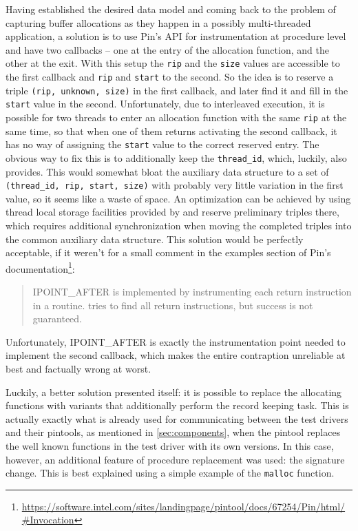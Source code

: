 Having established the desired data model and coming back to the problem of capturing buffer allocations as they
happen in a possibly multi-threaded application, a solution is to use Pin's API for instrumentation
at procedure level and have two callbacks -- one at the entry of the allocation function, and the other at the
exit. With this setup the \texttt{rip} and the \texttt{size} values are accessible to the first callback and
\texttt{rip} and \texttt{start} to the second. So the idea is to reserve a triple \texttt{(rip, unknown, size)}
in the first callback, and later find it and fill in the \texttt{start} value in the second. Unfortunately, due
to interleaved execution, it is possible for two threads to enter an allocation function with the same
\texttt{rip} at the same time, so that when one of them returns activating the second callback, it has no way
of assigning the \texttt{start} value to the correct reserved entry. The obvious way to fix this is to
additionally keep the \texttt{thread\_id}, which, luckily, \pin also provides. This would somewhat bloat the
auxiliary data structure to a set of \texttt{(thread\_id, rip, start, size)} with probably very little
variation in the first value, so it seems like a waste of space. An optimization can be achieved by using
thread local storage facilities provided by \pin and reserve preliminary triples there, which requires
additional synchronization when moving the completed triples into the common auxiliary data structure. This
solution would be perfectly acceptable, if it weren't for a small comment in the examples section of Pin's
documentation\footnote{\url{https://software.intel.com/sites/landingpage/pintool/docs/67254/Pin/html/\#Invocation}}:
\begin{quote}
{\small IPOINT\_AFTER} is implemented by instrumenting each return instruction in a routine. \pin tries to find
all return instructions, but success is not guaranteed.
\end{quote}
Unfortunately, {\small IPOINT\_AFTER} is exactly the instrumentation point needed to implement the second
callback, which makes the entire contraption unreliable at best and factually wrong at worst.

Luckily, a better solution presented itself: it is possible to replace the allocating functions with variants
that additionally perform the record keeping task.
This is actually exactly what is already used for communicating between the test drivers and their pintools, as
mentioned in \cref{sec:components}, when the pintool replaces the well known functions in the test driver with
its own versions. In this case, however, an additional feature of procedure replacement was used: the signature
change. This is best explained using a simple example of the \texttt{malloc} function.

